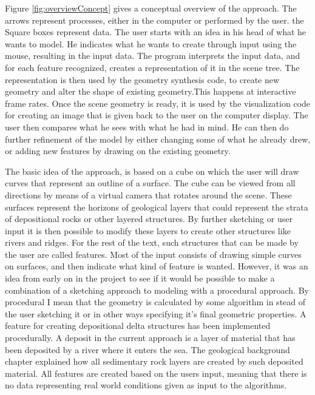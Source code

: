 \documentclass[a4paper,12pt]{report}
\begin{document}
Figure \ref{fig:overviewConcept} gives a conceptual overview of the approach. The arrows represent processes, either in the computer or performed by the user. the Square boxes represent data. The user starts with an idea in his head of what he wants to model. He indicates what he wants to create through input using the mouse, resulting in the input data. The program interprets the input data, and for each feature recognized, creates a representation of it in the scene tree. The representation is then used by the geometry synthesis code, to create new geometry and alter the shape of existing geometry.This happens at interactive frame rates. Once the scene geometry is ready, it is used by the visualization code for creating an image that is given back to the user on the computer display. The user then compares what he sees with what he had in mind. He can then do further refinement of the model by either changing some of what he already drew, or adding new features by drawing on the existing geometry.

The basic idea of the approach, is based on a cube on which the user will draw curves that represent an outline of a surface. The cube can be viewed from all directions by means of a virtual camera that rotates around the scene. These surfaces represent the horizons of geological layers that could represent the strata of depositional rocks or other layered structures. By further sketching or user input it is then possible to modify these layers to create other structures like rivers and ridges. For the rest of the text, such structures that can be made by the user are called features. Most of the input consists of drawing simple curves on surfaces, and then indicate what kind of feature is wanted. However, it was an idea from early on in the project to see if it would be possible to make a combination of a sketching approach to modeling with a procedural approach. By procedural I mean that the geometry is calculated by some algorithm in stead of the user sketching it or in other ways specifying it's final 
geometric properties. A feature for creating depositional delta structures has been implemented procedurally. A deposit in the current approach is a layer of material that has been deposited by a river where it enters the sea. The geological background chapter explained how all sedimentary rock layers are created by such deposited material. All features are created based on the users input, meaning that there is no data representing real world conditions given as input to the algorithms.
\end{document}
